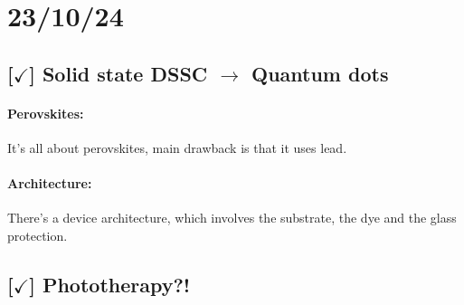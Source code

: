 \section{23/10/24}

\subsection{[$\checkmark$] Solid state DSSC $\rightarrow$ Quantum dots}

\paragraph{Perovskites:}It's all about perovskites, main drawback is that it uses lead.
\paragraph{Architecture:}There's a device architecture, which involves the substrate, the dye and the glass protection.

\subsection{[$\checkmark$] Phototherapy?!}